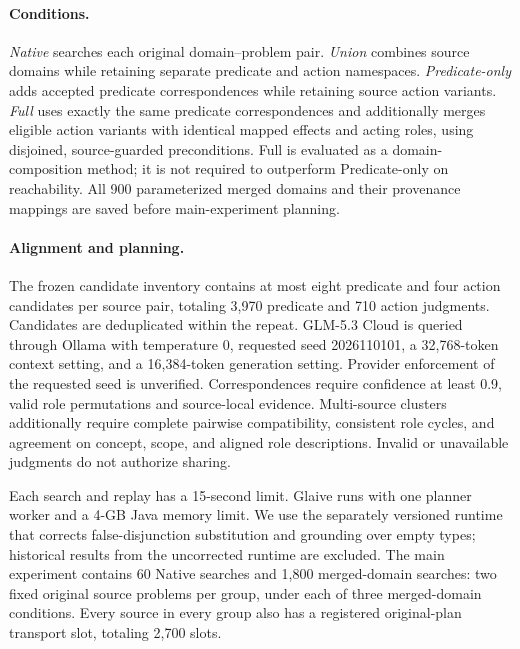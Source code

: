 \paragraph{Conditions.}
\emph{Native} searches each original domain--problem pair. \emph{Union} combines source domains while retaining separate predicate and action namespaces. \emph{Predicate-only} adds accepted predicate correspondences while retaining source action variants. \emph{Full} uses exactly the same predicate correspondences and additionally merges eligible action variants with identical mapped effects and acting roles, using disjoined, source-guarded preconditions. Full is evaluated as a domain-composition method; it is not required to outperform Predicate-only on reachability. All 900 parameterized merged domains and their provenance mappings are saved before main-experiment planning.

\paragraph{Alignment and planning.}
The frozen candidate inventory contains at most eight predicate and four action candidates per source pair, totaling 3,970 predicate and 710 action judgments. Candidates are deduplicated within the repeat. GLM-5.3 Cloud is queried through Ollama with temperature 0, requested seed 2026110101, a 32,768-token context setting, and a 16,384-token generation setting. Provider enforcement of the requested seed is unverified. Correspondences require confidence at least 0.9, valid role permutations and source-local evidence. Multi-source clusters additionally require complete pairwise compatibility, consistent role cycles, and agreement on concept, scope, and aligned role descriptions. Invalid or unavailable judgments do not authorize sharing.

Each search and replay has a 15-second limit. Glaive runs with one planner worker and a 4-GB Java memory limit. We use the separately versioned runtime that corrects false-disjunction substitution and grounding over empty types; historical results from the uncorrected runtime are excluded. The main experiment contains 60 Native searches and 1,800 merged-domain searches: two fixed original source problems per group, under each of three merged-domain conditions. Every source in every group also has a registered original-plan transport slot, totaling 2,700 slots.

